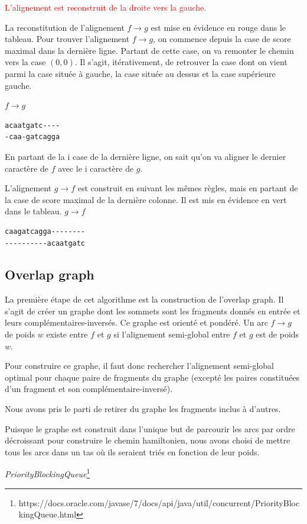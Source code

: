 \documentclass{article}
\begin{document}
\textcolor{red}{L'alignement est reconstruit de la droite vers la gauche.}

La reconstitution de l'alignement $f \to g$ est mise en évidence en rouge dans le tableau. Pour trouver l'alignement $f \to g$, on  commence depuis la case de score maximal dans la dernière ligne. 
Partant de cette case, on va remonter le chemin vers la case $(0,0)$. Il s'agit, itérativement, de retrouver la case dont on vient parmi la case située à gauche, la case située au dessus et la case supérieure gauche.



$f \to g$
\begin{verbatim}
acaatgatc----
-caa-gatcagga
\end{verbatim}
En partant de la i case de la dernière ligne, on sait qu'on va aligner le dernier caractère de $f$ avec le i caractère de $g$. 

L'alignement $g \to f$ est construit en suivant les mêmes règles, mais en partant de la case de score maximal de la dernière colonne. Il est mis en évidence en vert dans le tableau.
$g \to f$
\begin{verbatim}
caagatcagga--------
----------acaatgatc
\end{verbatim}


\subsection{Overlap graph}

La première étape de cet algorithme est la construction de l'overlap graph. Il s'agit de créer un graphe dont les sommets sont les fragments donnés en entrée et leurs complémentaires-inversés. Ce graphe est orienté et pondéré. Un arc $f\to g$ de poids $w$ existe entre $f$ et $g$ si l'alignement semi-global entre $f$ et $g$ est de poids $w$.

Pour construire ce graphe, il faut donc rechercher l'alignement semi-global optimal pour chaque paire de fragments du graphe (excepté les paires constituées d'un fragment et son complémentaire-inversé).

Nous avons pris le parti de retirer du graphe les fragments inclus à d'autres.

Puisque le graphe est construit dans l'unique but de parcourir les arcs par ordre décroissant pour construire le chemin hamiltonien, nous avons choisi de mettre tous les arcs dans un tas où ils seraient triés en fonction de leur poids.

\textit{PriorityBlockingQueue}\footnote{https://docs.oracle.com/javase/7/docs/api/java/util/concurrent/PriorityBlockingQueue.html}
\end{document}
